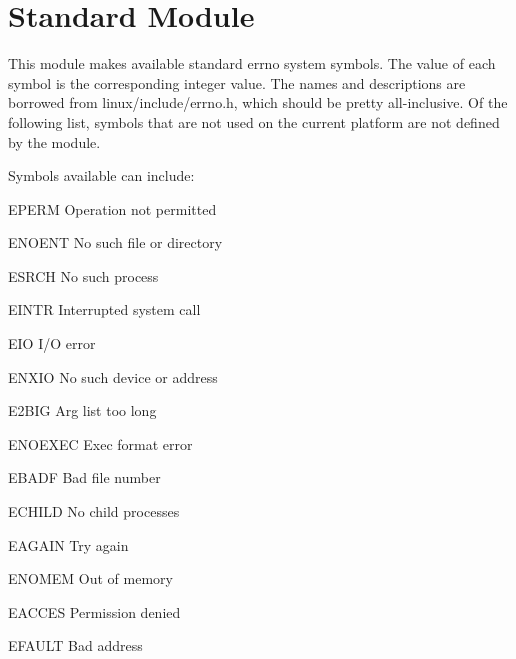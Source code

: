 \section{Standard Module }

\renewcommand{\indexsubitem}{(in module errno)}

This module makes available standard errno system symbols.
The value of each symbol is the corresponding integer value.
The names and descriptions are borrowed from linux/include/errno.h,
which should be pretty all-inclusive.  Of the following list, symbols
that are not used on the current platform are not defined by the
module.

Symbols available can include:
\begin{datadesc}{EPERM} Operation not permitted \end{datadesc}
\begin{datadesc}{ENOENT} No such file or directory \end{datadesc}
\begin{datadesc}{ESRCH} No such process \end{datadesc}
\begin{datadesc}{EINTR} Interrupted system call \end{datadesc}
\begin{datadesc}{EIO} I/O error \end{datadesc}
\begin{datadesc}{ENXIO} No such device or address \end{datadesc}
\begin{datadesc}{E2BIG} Arg list too long \end{datadesc}
\begin{datadesc}{ENOEXEC} Exec format error \end{datadesc}
\begin{datadesc}{EBADF} Bad file number \end{datadesc}
\begin{datadesc}{ECHILD} No child processes \end{datadesc}
\begin{datadesc}{EAGAIN} Try again \end{datadesc}
\begin{datadesc}{ENOMEM} Out of memory \end{datadesc}
\begin{datadesc}{EACCES} Permission denied \end{datadesc}
\begin{datadesc}{EFAULT} Bad address \end{datadesc}
